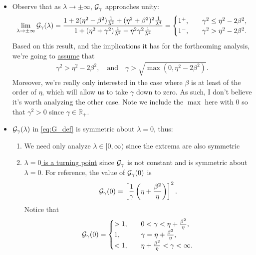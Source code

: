\documentclass[a4paper,10pt]{article}
\begin{document}
{\begin{itemize}
\item Observe that as $\lambda \to \pm \infty$, ${\cal G}_{\gamma}$ approaches unity:
\begin{align}
\label{eq:Gunity}
\lim \limits_{\lambda \to \pm \infty} {\cal G}_{\gamma}(\lambda) 
= 
\frac{1 + 2(\eta^2 - \beta^2)\tfrac{1}{\lambda^2} + (\eta^2 + \beta^2)^2\tfrac{1}{\lambda^4}}{1 + (\eta^2 + \gamma^2)\tfrac{1}{\lambda^2} + \eta^2 \gamma^2 \tfrac{1}{\lambda^4}} 
=
\begin{cases}
1^{+}, \quad &\gamma^2 \leq \eta^2 - 2 \beta^2, \\
1^{-}, \quad &\gamma^2 > \eta^2 - 2 \beta^2.
\end{cases}
\end{align}
Based on this result, and the implications it has for the forthcoming analysis, we're going to \underline{assume} that 
\begin{align} 
\label{eq:gam_ass}
\gamma^2 > \eta^2 - 2 \beta^2, 
\quad
\textrm{and}
\quad
\gamma > \sqrt{\max(0, \eta^2 - 2 \beta^2)}.
\end{align}
Moreover, we're really only interested in the case where $\beta$ is at least of the order of $\eta$, which will allow us to take $\gamma$ down to zero. As such, I don't believe it's worth analyzing the other case.
Note we include the $\max$ here with 0 so that $\gamma^2  > 0$ since $\gamma \in \mathbb{R}_+$.

\item ${\cal G}_{\gamma}(\lambda)$ in \eqref{eq:G_def} is symmetric about $\lambda  = 0$, thus:
\begin{enumerate}
\setlength \itemsep{1ex}

\item We need only analyze $\lambda \in [0, \infty)$ since the extrema are also symmetric

\item \underline{$\lambda = 0$ is a turning point} since ${\cal G}_{\gamma}$ is not constant and is symmetric about $\lambda = 0$. For reference, the value of ${\cal G}_{\gamma}(0)$ is
\begin{align} \label{eq:G0}
{\cal G}_{\gamma}(0) = \left[ \frac{1}{\gamma} \left( \eta +  \frac{\beta^2}{\eta} \right) \right]^2.
\end{align}
Notice that
\begin{align}
\label{eq:G0_sizes}
{\cal G}_{\gamma}(0) 
=
\begin{cases}
> 1, \quad &0 < \gamma <  \eta +  \frac{\beta^2}{\eta}, \\
1, \quad &\gamma =  \eta +  \frac{\beta^2}{\eta}, \\
< 1, \quad  &\eta +  \frac{\beta^2}{\eta} < \gamma < \infty.
\end{cases}
\end{align}


\end{enumerate}
\end{itemize}}
\end{document}
